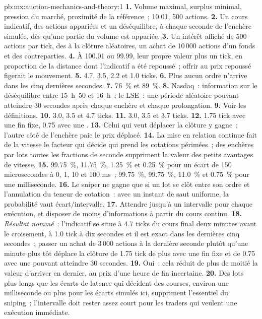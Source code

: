 \begin{solution}{pb:mx:auction-mechanics-and-theory:1}
\textbf{1.} Volume maximal, surplus minimal, pression du marché, proximité de la référence~; 10.01, 500 actions.
\textbf{2.} Un cours indicatif, des actions appariées et un déséquilibre, à chaque seconde de l'enchère simulée, dès qu'une partie du volume est appariée.
\textbf{3.} Un intérêt affiché de 500 actions par tick, des  à la clôture aléatoires, un achat de 10\,000 actions d'un fonds et des contreparties.
\textbf{4.} À 100.01 ou 99.99, leur propre valeur plus un tick, en proportion de la distance dont l'indicatif a été repoussé~; offrir au prix repoussé
figerait le mouvement.
\textbf{5.} 4.7, 3.5, 2.2 et 1.0 ticks.
\textbf{6.} Plus aucun ordre n'arrive dans les cinq dernières secondes.
\textbf{7.} 76~\% et 89~\%.
\textbf{8.} Nasdaq~: information sur le déséquilibre entre 15~h~50 et 16~h~; le LSE~: une période aléatoire pouvant atteindre 30 secondes après chaque enchère et chaque prolongation.
\textbf{9.} Voir les définitions.
\textbf{10.} 3.0, 3.5 et 4.7 ticks.
\textbf{11.} 3.0, 3.5 et 3.7 ticks.
\textbf{12.} 1.75 tick avec une fin fixe, 0.75 avec une .
\textbf{13.} Celui qui veut déplacer la clôture y gagne~; l'autre côté de l'enchère paie le prix déplacé.
\textbf{14.} La mise en relation continue fait de la vitesse le facteur qui décide qui prend les cotations périmées~; des enchères par lots toutes les fractions de seconde suppriment la valeur des petits
avantages de vitesse.
\textbf{15.} 99.75~\%, 11.75~\%, 1.25~\% et 0.25~\% pour un écart de 150 microsecondes à 0, 1, 10 et 100 ms~; 99.75~\%, 99.75~\%, 11.0~\% et 0.75~\% pour une milliseconde.
\textbf{16.} Le sniper ne gagne que si un lot se clôt entre son ordre et l'annulation du teneur de cotation~: avec un instant de saut uniforme, la probabilité vaut écart$/$intervalle.
\textbf{17.} Attendre jusqu'à un intervalle pour chaque exécution, et disposer de moins d'informations à partir du cours continu.
\textbf{18.} \emph{Résultat nommé}~: l'indicatif se situe à 4.7 ticks du cours final deux minutes avant le croisement, à 1.0 tick à dix secondes et il est exact dans les dernières
cinq secondes~; passer un achat de 3\,000 actions à la dernière seconde plutôt qu'une minute plus tôt déplace la clôture de 1.75 tick de plus avec une fin fixe et de 0.75 avec une  pouvant atteindre 30 secondes.
\textbf{19.} Oui~: cela réduit de plus de moitié la valeur d'arriver en dernier, au prix d'une heure de fin incertaine.
\textbf{20.} Des lots plus longs que les écarts de latence qui décident des courses, environ une milliseconde ou plus pour les écarts simulés ici, suppriment l'essentiel du sniping~;
l'intervalle doit rester assez court pour les traders qui veulent une exécution immédiate.
\end{solution}

